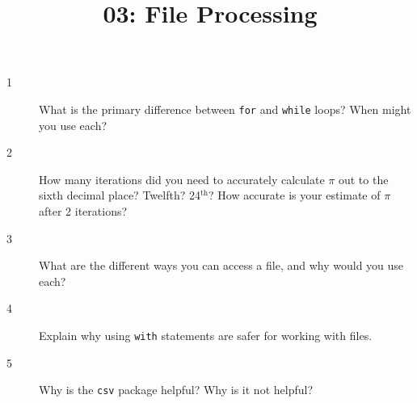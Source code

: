 \documentclass[10pt]{amsart}
\title{03: File Processing}
\begin{document}
\maketitle

\begin{description}
\item[1] What is the primary difference between \verb+for+ and \verb+while+
loops? When might you use each?
\vspace{0.75in}

\item[2] How many iterations did you need to accurately calculate $\pi$ out to
the sixth decimal place? Twelfth? 24$^{\textrm{th}}$? How accurate is your
estimate of $\pi$ after 2 iterations?
\vspace{0.75in}

\item[3] What are the different ways you can access a file, and why would you
use each?
\vspace{0.75in}

\item[4] Explain why using \verb+with+ statements are safer for working with
files.
\vspace{0.75in}

\item[5] Why is the \verb+csv+ package helpful? Why is it not helpful?
\vspace{0.75in}
\end{description}
\end{document}
